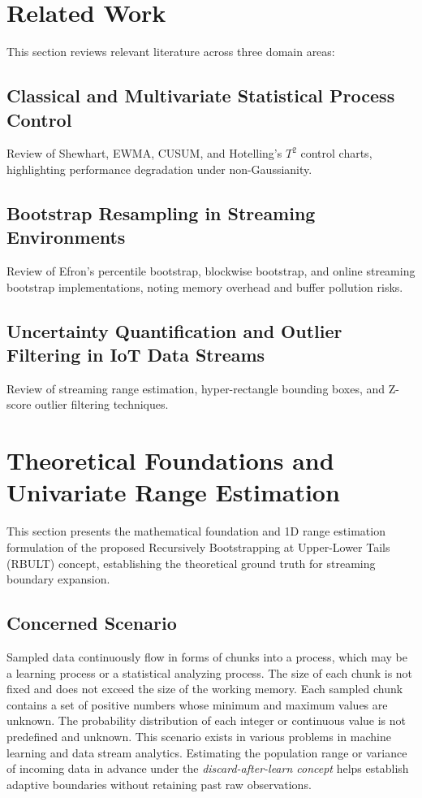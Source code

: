\documentclass[a4paper,fleqn]{cas-sc}
\begin{document}
\section{Related Work}\label{sec2_related}
This section reviews relevant literature across three domain areas:
\subsection{Classical and Multivariate Statistical Process Control}
Review of Shewhart, EWMA, CUSUM, and Hotelling's $T^2$ control charts, highlighting performance degradation under non-Gaussianity.

\subsection{Bootstrap Resampling in Streaming Environments}
Review of Efron's percentile bootstrap, blockwise bootstrap, and online streaming bootstrap implementations, noting memory overhead and buffer pollution risks.

\subsection{Uncertainty Quantification and Outlier Filtering in IoT Data Streams}
Review of streaming range estimation, hyper-rectangle bounding boxes, and Z-score outlier filtering techniques.


\section{Theoretical Foundations and Univariate Range Estimation}\label{sec3_theory}
This section presents the mathematical foundation and 1D range estimation formulation of the proposed Recursively Bootstrapping at Upper-Lower Tails (RBULT) concept, establishing the theoretical ground truth for streaming boundary expansion.

\subsection{Concerned Scenario}
\label{scenario}
Sampled data continuously flow in forms of chunks into a process, which may be a learning process or a statistical analyzing process. The size of each chunk is not fixed and does not exceed the size of the working memory. Each sampled chunk contains a set of positive numbers whose minimum and maximum values are unknown. The probability distribution of each integer or continuous value is not predefined and unknown. This scenario exists in various problems in machine learning and data stream analytics. Estimating the population range or variance of incoming data in advance under the \emph{discard-after-learn concept} helps establish adaptive boundaries without retaining past raw observations.
\end{document}
